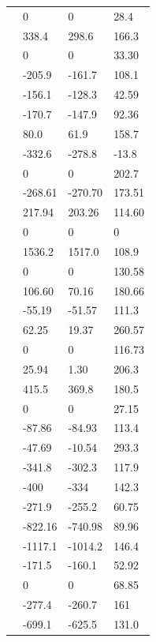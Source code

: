 \begin{supertabular}{llll}
     & 0 & 0 & 28.4 \\
     & 338.4 & 298.6 & 166.3 \\
     & 0 & 0 & 33.30 \\
     & -205.9 & -161.7 & 108.1 \\
     & -156.1 & -128.3 & 42.59 \\
     & -170.7 & -147.9 & 92.36 \\
     & 80.0 & 61.9 & 158.7 \\
     & -332.6 & -278.8 & -13.8 \\
     & 0 & 0 & 202.7 \\
     & -268.61 & -270.70 & 173.51 \\
     & 217.94 & 203.26 & 114.60 \\
     & 0 & 0 & 0 \\
     & 1536.2 & 1517.0 & 108.9 \\
     & 0 & 0 & 130.58 \\
     & 106.60 & 70.16 & 180.66 \\
     & -55.19 & -51.57 & 111.3 \\
     & 62.25 & 19.37 & 260.57 \\
     & 0 & 0 & 116.73 \\
     & 25.94 & 1.30 & 206.3 \\
     & 415.5 & 369.8 & 180.5 \\
     & 0 & 0 & 27.15 \\
     & -87.86 & -84.93 & 113.4 \\
     & -47.69 & -10.54 & 293.3 \\
     & -341.8 & -302.3 & 117.9 \\
     & -400 & -334 & 142.3 \\
     & -271.9 & -255.2 & 60.75 \\
     & -822.16 & -740.98 & 89.96 \\
     & -1117.1 & -1014.2 & 146.4 \\
     & -171.5 & -160.1 & 52.92 \\
     & 0 & 0 & 68.85 \\
     & -277.4 & -260.7 & 161 \\
     & -699.1 & -625.5 & 131.0 \\

\end{supertabular}
